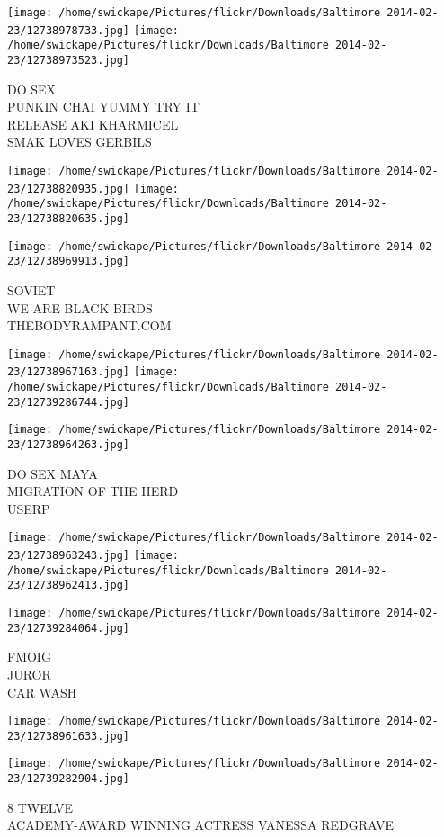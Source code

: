 \documentclass[10pt,letterpaper]{article}
\begin{document}
\texttt{[image: /home/swickape/Pictures/flickr/Downloads/Baltimore 2014-02-23/12738978733.jpg]}
\texttt{[image: /home/swickape/Pictures/flickr/Downloads/Baltimore 2014-02-23/12738973523.jpg]}

DO SEX\\
PUNKIN CHAI YUMMY TRY IT\\
RELEASE AKI KHARMICEL\\
SMAK LOVES GERBILS\\
\pagebreak

\texttt{[image: /home/swickape/Pictures/flickr/Downloads/Baltimore 2014-02-23/12738820935.jpg]}
\texttt{[image: /home/swickape/Pictures/flickr/Downloads/Baltimore 2014-02-23/12738820635.jpg]}

\vspace{0.25in}
\texttt{[image: /home/swickape/Pictures/flickr/Downloads/Baltimore 2014-02-23/12738969913.jpg]}

SOVIET\\
WE ARE BLACK BIRDS\\
THEBODYRAMPANT.COM\\
\pagebreak

\texttt{[image: /home/swickape/Pictures/flickr/Downloads/Baltimore 2014-02-23/12738967163.jpg]}
\texttt{[image: /home/swickape/Pictures/flickr/Downloads/Baltimore 2014-02-23/12739286744.jpg]}

\vspace{0.25in}
\texttt{[image: /home/swickape/Pictures/flickr/Downloads/Baltimore 2014-02-23/12738964263.jpg]}

DO SEX MAYA\\
MIGRATION OF THE HERD\\
USERP\\
\pagebreak

\texttt{[image: /home/swickape/Pictures/flickr/Downloads/Baltimore 2014-02-23/12738963243.jpg]}
\texttt{[image: /home/swickape/Pictures/flickr/Downloads/Baltimore 2014-02-23/12738962413.jpg]}

\texttt{[image: /home/swickape/Pictures/flickr/Downloads/Baltimore 2014-02-23/12739284064.jpg]}

FMOIG\\
JUROR\\
CAR WASH\\
\pagebreak

\texttt{[image: /home/swickape/Pictures/flickr/Downloads/Baltimore 2014-02-23/12738961633.jpg]}

\vspace{0.25in}
\texttt{[image: /home/swickape/Pictures/flickr/Downloads/Baltimore 2014-02-23/12739282904.jpg]}

8 TWELVE\\
ACADEMY{-}AWARD WINNING ACTRESS VANESSA REDGRAVE\\
\pagebreak
\end{document}
